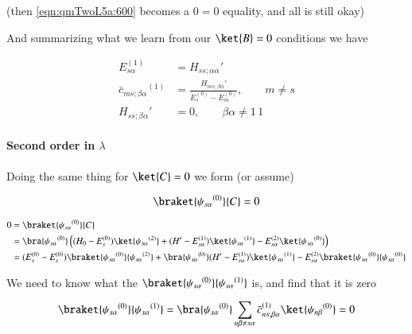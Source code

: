 (then \ref{eqn:qmTwoL5a:600} becomes a $0 = 0$ equality, and all is still okay)

And summarizing what we learn from our $\ket{B} = 0$ conditions we have

\begin{align}\label{eqn:qmTwoL5a:620}
E_{s \alpha}^{(1)} &= {H_{ss ; \alpha \alpha}}' \\
{\bar{c}_{ms ; \beta \alpha}}^{(1)}
&=
\frac{{H_{ms ; \beta \alpha}}' }
{ E_s^{(0)} - E_m^{(0)} }, \qquad {m \ne s} \\
{H_{ss ; \beta \alpha}}' &= 0, \qquad \beta \alpha \ne 1\,1
\end{align}

\paragraph{Second order in $\lambda$}

Doing the same thing for $\ket{C} = 0$ we form (or assume)

\begin{equation}\label{eqn:qmTwoL5a:640}
\braket{{\psi_{s \alpha}}^{(0)}}{C} = 0 
\end{equation}

\begin{align*}
0 
&= \braket{{\psi_{s \alpha}}^{(0)}}{C}  \\
&=
\bra{{\psi_{s \alpha}}^{(0)}}
\left(
(H_0 - E_s^{(0)}) \ket{{\psi_{s \alpha}}^{(2)}} 
+(H' - E_{s \alpha}^{(1)}) \ket{{\psi_{s \alpha}}^{(1)}} 
-E_{s \alpha}^{(2)} \ket{{\psi_{s \alpha}}^{(0)}}  
\right) \\
&=
(E_s^{(0)} - E_s^{(0)}) 
\braket{{\psi_{s \alpha}}^{(0)}}{{\psi_{s \alpha}}^{(2)}} 
+
\bra{{\psi_{s \alpha}}^{(0)}}
(H' - E_{s \alpha}^{(1)}) \ket{{\psi_{s \alpha}}^{(1)}} 
-E_{s \alpha}^{(2)} \braket{{\psi_{s \alpha}}^{(0)}}{{\psi_{s \alpha}}^{(0)}} 
\end{align*}

We need to know what the $\braket{{\psi_{s \alpha}}^{(0)}}{{\psi_{s \alpha}}^{(1)}}$ is, and find that it is zero

\begin{equation}\label{eqn:qmTwoL5a:660}
\braket{{\psi_{s \alpha}}^{(0)}}{{\psi_{s \alpha}}^{(1)}}
=
\bra{{\psi_{s \alpha}}^{(0)}}
\sum_{n\beta \ne s\alpha} {\bar{c}_{ns;\beta \alpha}}^{(1)} \ket{{\psi_{n \beta}}^{(0)}} = 0
\end{equation}

